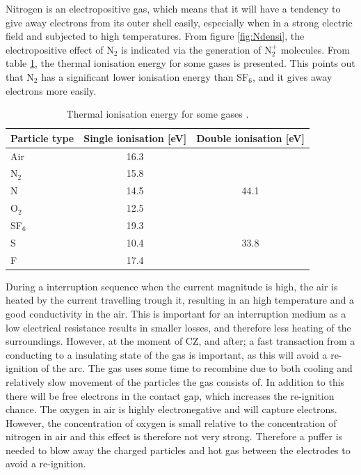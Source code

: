 \documentclass[10pt,a4paper,twoside]{article}
\begin{document}
Nitrogen is an electropositive gas, which means that it will have a tendency to give away electrons from its outer shell easily, especially when in a strong electric field and subjected to high temperatures. From figure \ref{fig:Ndensi}, the electropositive effect of N$_2$ is indicated via the generation of N$_{2}^{+}$ molecules. From table \ref{tab:thermalIonisation}, the thermal ionisation energy for some gases is presented. This points out that N$_2$ has a significant lower ionisation energy than SF$_6$, and it gives away electrons more easily.

\begin{table}[H]
\center
\caption{Thermal ionisation energy for some gases \cite{bib:HVEbreak}.}
\begin{tabular}{|l|c|c|}
\hline 
Particle type & Single ionisation [eV] & Double ionisation [eV] \\ 
\hline 
Air & 16.3 &  \\ 
\hline 
N$_2$ & 15.8 &  \\ 
\hline 
N & 14.5 & 44.1 \\ 
\hline 
O$_2$ & 12.5 &  \\ 
\hline 
SF$_6$ & 19.3 &  \\ 
\hline 
S & 10.4 & 33.8 \\ 
\hline 
F & 17.4 &  \\ 
\hline 
\end{tabular} 
\label{tab:thermalIonisation}
\end{table}

During a interruption sequence when the current magnitude is high, the air is heated by the current travelling trough it, resulting in an high temperature and a good conductivity in the air. This is important for an interruption medium as a low electrical resistance results in smaller losses, and therefore less heating of the surroundings. However, at the moment of CZ, and after; a fast transaction from a conducting to a insulating state of the gas is important, as this will avoid a re-ignition of the arc. The gas uses some time to recombine due to both cooling and relatively slow movement of the particles the gas consists of. In addition to this there will be free electrons in the contact gap, which increases the re-ignition chance. The oxygen in air is highly electronegative and will capture electrons. However, the concentration of oxygen is small relative to the concentration of nitrogen in air and this effect is therefore not very strong. Therefore a puffer is needed to blow away the charged particles and hot gas between the electrodes to avoid a re-ignition.
\end{document}

